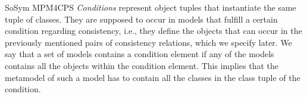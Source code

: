 \begin{copiedFrom}{SoSym MPM4CPS}
\emph{Conditions} represent object tuples that instantiate the same tuple of classes. They are supposed to occur in models that fulfill a certain condition regarding consistency, i.e., they define the objects that can occur in the previously mentioned pairs of consistency relations, which we specify later.
We say that a set of models contains a condition element if any of the models contains all the objects within the condition element. %
This implies that the metamodel of such a model has to contain all the classes in the class tuple of the condition.


\end{copiedFrom}
